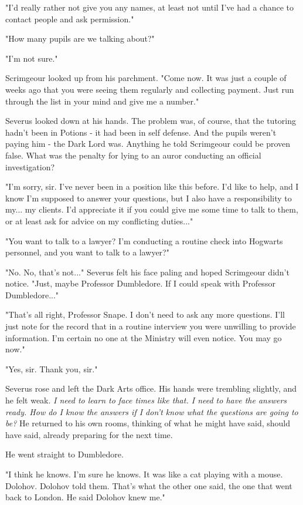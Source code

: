 \documentclass[a4paper,11pt]{article}
\begin{document}
"I'd really rather not give you any names, at least not until I've had a chance to contact people and ask permission."

"How many pupils are we talking about?"

"I'm not sure."

Scrimgeour looked up from his parchment. "Come now. It was just a couple of weeks ago that you were seeing them regularly and collecting payment. Just run through the list in your mind and give me a number."

Severus looked down at his hands. The problem was, of course, that the tutoring hadn't been in Potions - it had been in self defense. And the pupils weren't paying him - the Dark Lord was. Anything he told Scrimgeour could be proven false. What was the penalty for lying to an auror conducting an official investigation?

"I'm sorry, sir. I've never been in a position like this before. I'd like to help, and I know I'm supposed to answer your questions, but I also have a responsibility to my... my clients. I'd appreciate it if you could give me some time to talk to them, or at least ask for advice on my conflicting duties..."

"You want to talk to a lawyer? I'm conducting a routine check into Hogwarts personnel, and you want to talk to a lawyer?"

"No. No, that's not..." Severus felt his face paling and hoped Scrimgeour didn't notice. "Just, maybe Professor Dumbledore. If I could speak with Professor Dumbledore..."

"That's all right, Professor Snape. I don't need to ask any more questions. I'll just note for the record that in a routine interview you were unwilling to provide information. I'm certain no one at the Ministry will even notice. You may go now."

"Yes, sir. Thank you, sir."

Severus rose and left the Dark Arts office. His hands were trembling slightly, and he felt weak. \emph{I need to learn to face times like that. I need to have the answers ready. How do I know the answers if I don't know what the questions are going to be?} He returned to his own rooms, thinking of what he might have said, should have said, already preparing for the next time.

He went straight to Dumbledore.

"I think he knows. I'm sure he knows. It was like a cat playing with a mouse. Dolohov. Dolohov told them. That's what the other one said, the one that went back to London. He said Dolohov knew me."
\end{document}
